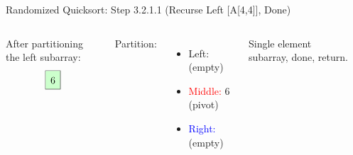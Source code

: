 \begin{frame}{Randomized Quicksort: Step 3.2.1.1 (Recurse Left [A[4,4]], Done)}
  \begin{columns}[t]
    After partitioning the left subarray:
    \[
      \renewcommand{\arraystretch}{1.5}
      \begin{array}{|c|c|c|}
        \hline
        \cellcolor{green!20}{6} \\
        \hline
      \end{array}
    \]

    Partition:
    \begin{itemize}
      \item \textcolor{green!60!black}{Left:} (empty)
      \item \textcolor{red}{Middle:} 6 (pivot)
      \item \textcolor{blue}{Right:} (empty)
    \end{itemize}
    Single element subarray, done, return.
    \begin{minipage}[t]{\linewidth}
      \vspace{0pt} %
      \begin{center}


\end{center}
\end{minipage}
\end{columns}
\end{frame}
